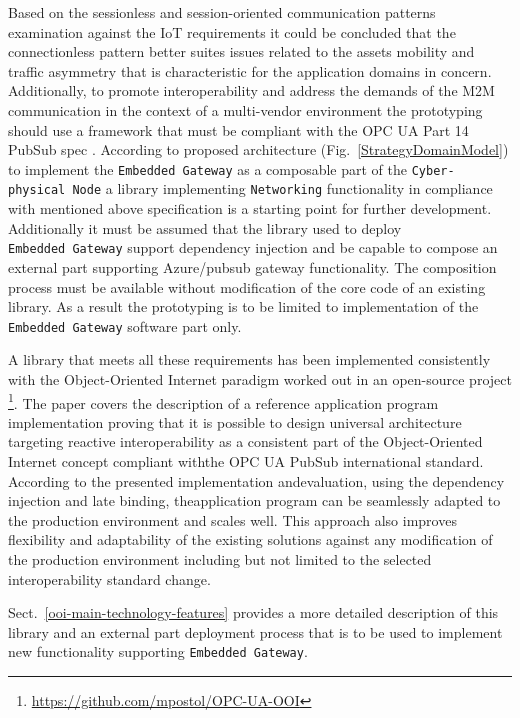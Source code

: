 \documentclass{jacsart}
\begin{document}
Based on the sessionless and session-oriented communication patterns examination against the IoT requirements \cite{mpostol2020} it could be concluded that the connectionless pattern better suites issues related to the assets mobility and traffic asymmetry that is characteristic for the application domains in concern. Additionally, to promote interoperability and address the demands of the M2M communication in the context of a multi-vendor environment the prototyping should use a framework that must be compliant with the OPC UA Part 14 PubSub spec \cite{RefWorks:doc:5d98837de4b055984c0eecf0}. According to proposed architecture (Fig.~\ref*{StrategyDomainModel}) to implement the \texttt{Embedded\ Gateway} as a composable part of the \texttt{Cyber-physical\ Node} a library implementing \texttt{Networking} functionality in compliance with mentioned above specification is a starting point for further development. Additionally it must be assumed that the library used to deploy \texttt{Embedded\ Gateway} support dependency injection and be capable to compose an external part supporting Azure/pubsub gateway functionality. The composition process must be available without modification of the core code of an existing library. As a result the prototyping is to be limited to implementation of the \texttt{Embedded\ Gateway} software part only.

A library that meets all these requirements has been implemented consistently with the Object-Oriented Internet paradigm \cite{RefWorks:doc:5c66740ae4b081adf5804596} worked out in an open-source project \footnote{ \url{https://github.com/mpostol/OPC-UA-OOI} }. The paper \cite{mpostol2020} covers the description of a reference application program implementation proving that it is possible to design universal architecture targeting reactive interoperability as a consistent part of the Object-Oriented Internet concept compliant withthe OPC UA PubSub \cite{RefWorks:doc:5d98837de4b055984c0eecf0} international standard. According to the presented implementation andevaluation, using the dependency injection and late binding, theapplication program can be seamlessly adapted to the production environment and scales well. This approach also improves flexibility and adaptability of the existing solutions against any modification of the production environment including but not limited to the selected interoperability standard change.

Sect.~\ref*{ooi-main-technology-features} provides a more detailed description of this library and an external part deployment process that is to be used to implement new functionality supporting \texttt{Embedded\ Gateway}.
\end{document}
